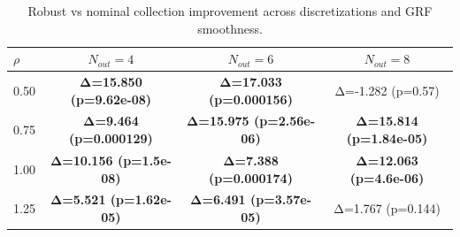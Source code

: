 \begin{table}[h]
\centering
\small
\begin{tabular}{l|ccc}
\toprule
$\rho$ & $N_{out}=4$ & $N_{out}=6$ & $N_{out}=8$ \\ \midrule
0.50 & \textbf{Δ=15.850 (p=9.62e-08)} & \textbf{Δ=17.033 (p=0.000156)} & Δ=-1.282 (p=0.57) \\
0.75 & \textbf{Δ=9.464 (p=0.000129)} & \textbf{Δ=15.975 (p=2.56e-06)} & \textbf{Δ=15.814 (p=1.84e-05)} \\
1.00 & \textbf{Δ=10.156 (p=1.5e-08)} & \textbf{Δ=7.388 (p=0.000174)} & \textbf{Δ=12.063 (p=4.6e-06)} \\
1.25 & \textbf{Δ=5.521 (p=1.62e-05)} & \textbf{Δ=6.491 (p=3.57e-05)} & Δ=1.767 (p=0.144) \\
\bottomrule
\end{tabular}
\caption{Robust vs nominal collection improvement across discretizations and GRF smoothness.}
\label{tab:collection_sweep}
\end{table}